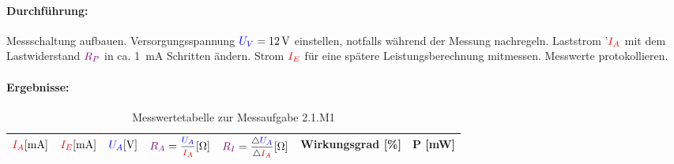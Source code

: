 \documentclass[11pt,a4paper,titlepage]{scrreprt}
\begin{document}
              \paragraph{Durchführung:} Messschaltung aufbauen. Versorgungsspannung $\textcolor{blue}{U_V} = \SI{12}{\volt}$ einstellen, notfalls
              während der Messung nachregeln. Laststrom '$\textcolor{red}{I_A}$ mit dem Lastwiderstand $\textcolor{violet}{R_P}$ in
              ca. \SI{1}{\milli\ampere} Schritten ändern. Strom $\textcolor{red}{I_E}$ für eine spätere Leistungsberechnung mitmessen.
              Messwerte protokollieren.

              \paragraph{Ergebnisse:}
                \begin{center}
                    \begin{table}[!hbtp]
                        \caption{Messwertetabelle zur Messaufgabe 2.1.M1}
                        \label{tbl:messergebnisse2.1}
                        \renewcommand{\arraystretch}{1.3}
                         \begin{center}
                            \begin{tabular}{ccccccc}
                                $\textcolor{red}{I_A} [\si{\milli\ampere}]$  &
                                $\textcolor{red}{I_E} [\si{\milli\ampere}]$ &
                                $\textcolor{blue}{U_A} [\si{\volt}]$ &
                                $\widerstand{R_A} = \mfrac{\spannung{U_A}}{\strom{I_A}} [\si{\ohm}]$ &
                                $\widerstand{R_I} = \mfrac{\triangle\spannung{U_A}}{\triangle\strom{I_A}} [\si{\ohm}]$ &
                                Wirkungsgrad [\%] &%
                                P [\si{\milli\watt}] %
                                \\ \hline


\end{tabular}
\end{center}
\end{table}
\end{center}
\end{document}
